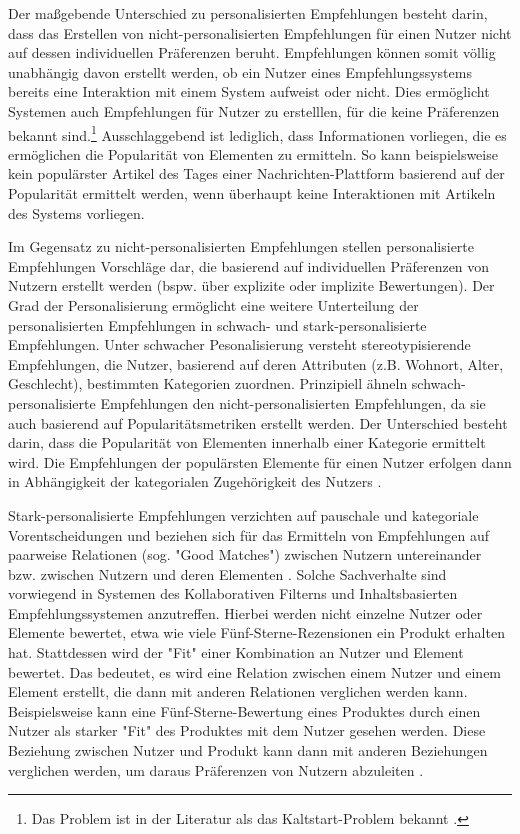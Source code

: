 Der maßgebende Unterschied zu personalisierten Empfehlungen besteht darin, dass das Erstellen von nicht-personalisierten Empfehlungen für einen Nutzer nicht auf dessen individuellen Präferenzen beruht.
Empfehlungen können somit völlig unabhängig davon erstellt werden, ob ein Nutzer eines Empfehlungssystems bereits eine Interaktion mit einem System aufweist oder nicht.
Dies ermöglicht Systemen auch Empfehlungen für Nutzer zu erstelllen, für die keine Präferenzen bekannt sind.\footnote{Das Problem ist in der Literatur als das Kaltstart-Problem bekannt \cite[S. 407]{unternährer:article}.}
Ausschlaggebend ist lediglich, dass Informationen vorliegen, die es ermöglichen die Popularität von Elementen zu ermitteln.
So kann beispielsweise kein populärster Artikel des Tages einer Nachrichten-Plattform basierend auf der Popularität ermittelt werden, wenn überhaupt keine Interaktionen mit Artikeln des Systems vorliegen.

Im Gegensatz zu nicht-personalisierten Empfehlungen stellen personalisierte Empfehlungen Vorschläge dar, die basierend auf individuellen Präferenzen von Nutzern erstellt werden (bspw. über explizite oder implizite Bewertungen).
Der Grad der Personalisierung ermöglicht eine weitere Unterteilung der personalisierten Empfehlungen in schwach- und stark-personalisierte Empfehlungen.
Unter schwacher Pesonalisierung versteht \textcite[S. 407]{unternährer:article} stereotypisierende Empfehlungen, die Nutzer, basierend auf deren Attributen (z.B. Wohnort, Alter, Geschlecht), bestimmten Kategorien zuordnen.
Prinzipiell ähneln schwach-personalisierte Empfehlungen den nicht-personalisierten Empfehlungen, da sie auch basierend auf Popularitätsmetriken erstellt werden.
Der Unterschied besteht darin, dass die Popularität von Elementen innerhalb einer Kategorie ermittelt wird.
Die Empfehlungen der populärsten Elemente für einen Nutzer erfolgen dann in Abhängigkeit der kategorialen Zugehörigkeit des Nutzers \cite[S. 407ff.]{unternährer:article}.

Stark-personalisierte Empfehlungen verzichten auf pauschale und kategoriale Vorentscheidungen und beziehen sich für das Ermitteln von Empfehlungen auf paarweise Relationen (sog. "Good Matches") zwischen Nutzern untereinander bzw. zwischen Nutzern und deren Elementen \cite[S. 415]{unternährer:article}.
Solche Sachverhalte sind vorwiegend in Systemen des Kollaborativen Filterns und Inhaltsbasierten Empfehlungssystemen anzutreffen.
Hierbei werden nicht einzelne Nutzer oder Elemente bewertet, etwa wie viele Fünf-Sterne-Rezensionen ein Produkt erhalten hat. 
Stattdessen wird der "Fit" einer Kombination an Nutzer und Element bewertet.
Das bedeutet, es wird eine Relation zwischen einem  Nutzer und einem Element erstellt, die dann mit anderen Relationen verglichen werden kann.
Beispielsweise kann eine Fünf-Sterne-Bewertung eines Produktes durch einen Nutzer als starker "Fit" des Produktes mit dem Nutzer gesehen werden.
Diese Beziehung zwischen Nutzer und Produkt kann dann mit anderen Beziehungen verglichen werden, um daraus Präferenzen von Nutzern abzuleiten \cite[S. 417]{unternährer:article}.

